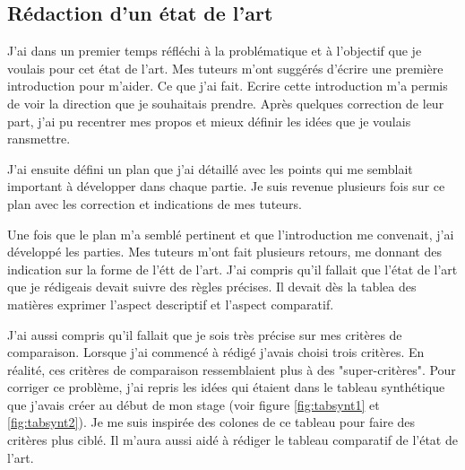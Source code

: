 \documentclass{article}
\begin{document}
	\subsection{Rédaction d'un état de l'art}
		J'ai dans un premier temps réfléchi à la problématique et à l'objectif que je voulais pour cet état de l'art. Mes tuteurs m'ont suggérés d'écrire une première introduction pour m'aider. Ce que j'ai fait.
		Ecrire cette introduction m'a permis de voir la direction que je souhaitais prendre.
		Après quelques correction de leur part, j'ai pu recentrer mes propos et mieux définir les idées que je voulais ransmettre.\par
		J'ai ensuite défini un plan que j'ai détaillé avec les points qui me semblait important à développer dans chaque partie. Je suis revenue plusieurs fois sur ce plan avec les correction et indications de mes tuteurs.\par
		Une fois que le plan m'a semblé pertinent et que l'introduction me convenait, j'ai développé les parties. Mes tuteurs m'ont fait plusieurs retours, me donnant des indication sur la forme de l'étt de l'art. 
		J'ai compris qu'il fallait que l'état de l'art que je rédigeais devait suivre des règles précises. 
		Il devait dès la tablea des matières exprimer l'aspect descriptif et l'aspect comparatif.\par
		J'ai aussi compris qu'il fallait que je sois très précise sur mes critères de comparaison. 
		Lorsque j'ai commencé à rédigé j'avais choisi trois critères. 
		En réalité, ces critères de comparaison ressemblaient plus à des "super-critères". 
		Pour corriger ce problème, j'ai repris les idées qui étaient dans le tableau synthétique que j'avais créer au début de mon stage (voir figure \ref{fig:tabsynt1} et \ref{fig:tabsynt2}). 
		Je me suis inspirée des colones de ce tableau pour faire des critères plus ciblé. Il m'aura aussi aidé à rédiger le tableau comparatif de l'état de l'art.
\end{document}
